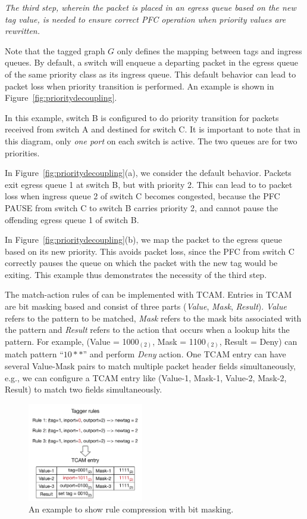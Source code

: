 {\em The third step, wherein the packet is placed in an egress queue based on the
{\em new} tag value, is needed to ensure correct PFC operation when priority
values are rewritten.}

Note that the tagged graph $G$ only defines the mapping between tags and ingress
queues. By default, a switch will enqueue a departing packet in the egress queue
of the same priority class as its ingress queue. This default behavior can lead
to packet loss when priority transition is performed. An example is shown in
Figure~\ref{fig:prioritydecoupling}. 
 
In this example, switch B is configured to do priority transition for packets
received from switch A and destined for switch C. It is important to note that
in this diagram, only {\em one port} on each switch is active. The two queues
are for two priorities.
 
In Figure~\ref{fig:prioritydecoupling}(a), we consider the default behavior.
Packets exit egress queue 1 at switch B, but with priority 2.  This can lead to
to packet loss when ingress queue 2 of switch C becomes congested, because 
the PFC PAUSE from switch C to switch B carries priority 2, and cannot pause 
the offending egress queue 1 of switch B. 
 
In Figure~\ref{fig:prioritydecoupling}(b), we map the packet to the egress queue
based on its new priority.  This avoids packet loss, since the PFC from switch C
correctly pauses the queue on which the packet with the new tag would be
exiting. This example thus demonstrates the necessity of the third step.

  The match-action rules of
\sysname{} can be implemented with TCAM. Entries in TCAM are bit masking based
and consist of three parts ({\em Value}, {\em Mask}, {\em Result}). {\em Value}
refers to the pattern to be matched, {\em Mask} refers to the mask bits
associated with the pattern and {\em Result} refers to the action that occurs
when a lookup hits the pattern. For example, (Value = 1000$_{(2)}$, Mask =
1100$_{(2)}$, Result = Deny) can match pattern ``$10**$'' and perform {\em Deny}
action. One TCAM entry can have several Value-Mask pairs to match multiple
packet header fields simultaneously, e.g., we can configure a TCAM entry like
(Value-1, Mask-1, Value-2, Mask-2, Result) to match two fields simultaneously.

\begin{figure}
	\centering
	\includegraphics[width=0.45\textwidth] {figs/compression_with_bitmasking}
	\caption{An example to show rule compression with bit masking.}\label{fig:compression}
	
\end{figure}


